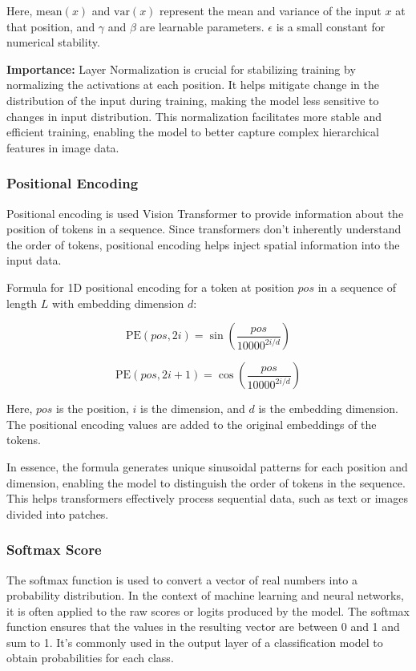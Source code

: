 \noindent Here, $\text{mean}(x)$ and $\text{var}(x)$ represent the mean and variance of the input $x$ at that position, and $\gamma$ and $\beta$ are learnable parameters. $\epsilon$ is a small constant for numerical stability.

\noindent \textbf{Importance:}
Layer Normalization is crucial for stabilizing training by normalizing the activations at each position. It helps mitigate change in the distribution of the input during training, making the model less sensitive to changes in input distribution. This normalization facilitates more stable and efficient training, enabling the model to better capture complex hierarchical features in image data.

\subsubsection{Positional Encoding}
Positional encoding is used Vision Transformer to provide information about the position of tokens in a sequence. Since transformers don't inherently understand the order of tokens, positional encoding helps inject spatial information into the input data.

\noindent Formula for 1D positional encoding for a token at position $pos$ in a sequence of length $L$ with embedding dimension $d$:

\begin{equation}
    \text{PE}(pos, 2i) = \sin\left(\frac{pos}{10000^{2i/d}}\right) \label{eq:pos_encoding_sin}
\end{equation}

\begin{equation}
    \text{PE}(pos, 2i+1) = \cos\left(\frac{pos}{10000^{2i/d}}\right) \label{eq:pos_encoding_cos}
\end{equation}


\noindent Here, $pos$ is the position, $i$ is the dimension, and $d$ is the embedding dimension. The positional encoding values are added to the original embeddings of the tokens.

\noindent In essence, the formula generates unique sinusoidal patterns for each position and dimension, enabling the model to distinguish the order of tokens in the sequence. This helps transformers effectively process sequential data, such as text or images divided into patches.

\subsubsection{Softmax Score}
The softmax function is used to convert a vector of real numbers into a probability distribution. In the context of machine learning and neural networks, it is often applied to the raw scores or logits produced by the model. The softmax function ensures that the values in the resulting vector are between 0 and 1 and sum to 1. It's commonly used in the output layer of a classification model to obtain probabilities for each class.


